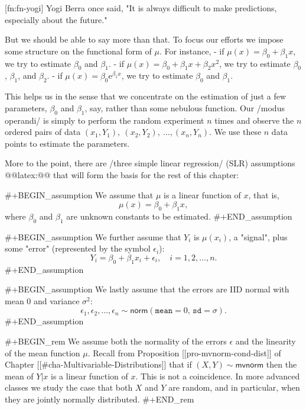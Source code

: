 [fn:fn-yogi] Yogi Berra once said, "It is always difficult to make
predictions, especially about the future."

But we should be able to say more than that. To focus our efforts we
impose some structure on the functional form of \(\mu\). For instance,
- if \(\mu(x)=\beta_{0}+\beta_{1}x\), we try to estimate \( \beta_{0}
  \) and \( \beta_{1} \).
- if \( \mu(x) = \beta_{0} + \beta_{1}x + \beta_{2}x^{2} \), we try to
  estimate \(\beta_{0}\), \(\beta_{1}\), and \(\beta_{2}\).
- if \( \mu(x) = \beta_{0} \mathrm{e}^{\beta_{1}x} \), we try to
  estimate \(\beta_{0}\) and \(\beta_{1}\).

This helps us in the sense that we concentrate on the estimation of
just a few parameters, \(\beta_{0}\) and \(\beta_{1}\), say, rather
than some nebulous function. Our /modus operandi/ is simply to perform
the random experiment \(n\) times and observe the \(n\) ordered pairs
of data \( (x_{1},Y_{1}),\ (x_{2},Y_{2}),\ \ldots,(x_{n},Y_{n}) \). We
use these \(n\) data points to estimate the parameters.

More to the point, there are /three simple linear regression/ (SLR)
assumptions @@latex:@@ that will form
the basis for the rest of this chapter:

#+BEGIN_assumption
We assume that \(\mu\) is a linear function of \(x\), that is, 
\begin{equation}
\mu(x)=\beta_{0}+\beta_{1}x,
\end{equation}
where \(\beta_{0}\) and \(\beta_{1}\) are unknown constants to be
estimated.
#+END_assumption

#+BEGIN_assumption
We further assume that \( Y_{i} \) is \( \mu(x_{i}) \), a "signal",
plus some "error" (represented by the symbol \( \epsilon_{i} \)):
\begin{equation}
Y_{i} = \beta_{0} + \beta_{1}x_{i} + \epsilon_{i}, \quad i = 1,2,\ldots,n.
\end{equation}
#+END_assumption

#+BEGIN_assumption
We lastly assume that the errors are IID normal with mean 0 and
variance \( \sigma^{2} \):
\begin{equation}
\epsilon_{1},\epsilon_{2},\ldots,\epsilon_{n}\sim\mathsf{norm}(\mathtt{mean}=0,\,\mathtt{sd}=\sigma).
\end{equation}
#+END_assumption

#+BEGIN_rem
We assume both the normality of the errors \(\epsilon\) and the
linearity of the mean function \( \mu \). Recall from Proposition
[[pro-mvnorm-cond-dist]] of Chapter
[[#cha-Multivariable-Distributions]] that if \( (X,Y) \sim
\mathsf{mvnorm} \) then the mean of \(Y|x\) is a linear function of
\(x\). This is not a coincidence. In more advanced classes we study
the case that both \(X\) and \(Y\) are random, and in particular, when
they are jointly normally distributed.
#+END_rem

